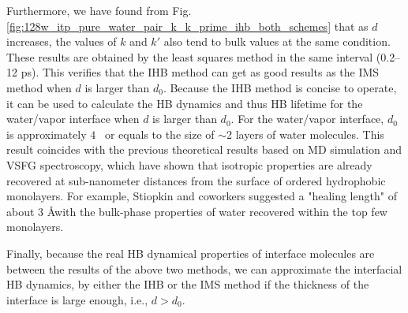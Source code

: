 Furthermore, we have found from Fig.\thinspace\ref{fig:128w_itp_pure_water_pair_k_k_prime_ihb_both_schemes} that as $d$ increases, 
the values of $k$ and $k'$ also tend to bulk values at the same condition.
These results are obtained by the least squares method in the same interval (0.2--12 ps). This verifies that the IHB method 
can get as good results as the IMS method when $d$ is larger than $d_0$. 
Because the IHB method is concise to operate, it can be used to calculate the HB dynamics and thus HB lifetime for the water/vapor interface 
when $d$ is larger than $d_0$. For the water/vapor interface, $d_0$ is approximately $4$ \A \ or equals to the size of $\sim$2 layers of water molecules. 
This result coincides with the previous theoretical results based on MD simulation\cite{Townsend1985,Taylor1996,Morita2000} 
and VSFG spectroscopy\cite{Tyrode2013}, which have shown that isotropic properties are already recovered 
at sub-nanometer distances from the surface of ordered hydrophobic monolayers.
For example, Stiopkin and coworkers suggested a "healing length" of about 3 \AA with the bulk-phase properties of water recovered within the top few monolayers\cite{Stiopkin2011}.

Finally, because the real HB dynamical properties of interface molecules are between the results of the above two methods, 
we can approximate the interfacial HB dynamics, by either the IHB or the IMS method if the thickness of the interface is large enough, i.e., $d>d_0$.



